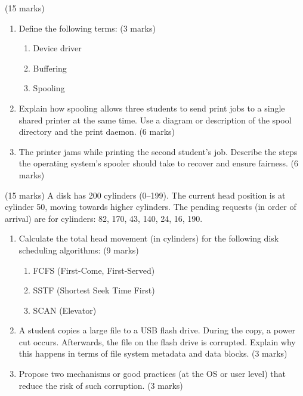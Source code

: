 \documentclass[11pt]{article}
\newcounter{popsec}
\newcounter{popsub}
\newcommand{\courssub}[1]{%
  \stepcounter{popsub}%
  \par\vspace{9pt}\noindent{\popxbold\fontsize{11.5}{13}\selectfont\color{popink}{\color{poporange}\thepopsec.\thepopsub}\hspace{6pt}#1}\par\nopagebreak\vspace{4pt}
}
\begin{document}
\courssub{I prepare for the GCE}

\begin{exercice} (15 marks)
\begin{enumerate}
\item Define the following terms: (3 marks)
      \begin{enumerate}
      \item Device driver
      \item Buffering
      \item Spooling
      \end{enumerate}
\item Explain how spooling allows three students to send print jobs to a single shared printer at the same time. Use a diagram or description of the spool directory and the print daemon. (6 marks)
\item The printer jams while printing the second student's job. Describe the steps the operating system's spooler should take to recover and ensure fairness. (6 marks)
\end{enumerate}
\end{exercice}

\begin{exercice} (15 marks)
A disk has 200 cylinders (0–199). The current head position is at cylinder 50, moving towards higher cylinders. The pending requests (in order of arrival) are for cylinders: 82, 170, 43, 140, 24, 16, 190.
\begin{enumerate}
\item Calculate the total head movement (in cylinders) for the following disk scheduling algorithms: (9 marks)
      \begin{enumerate}
      \item FCFS (First-Come, First-Served)
      \item SSTF (Shortest Seek Time First)
      \item SCAN (Elevator)
      \end{enumerate}
\item A student copies a large file to a USB flash drive. During the copy, a power cut occurs. Afterwards, the file on the flash drive is corrupted. Explain why this happens in terms of file system metadata and data blocks. (3 marks)
\item Propose two mechanisms or good practices (at the OS or user level) that reduce the risk of such corruption. (3 marks)
\end{enumerate}
\end{exercice}
\end{document}
